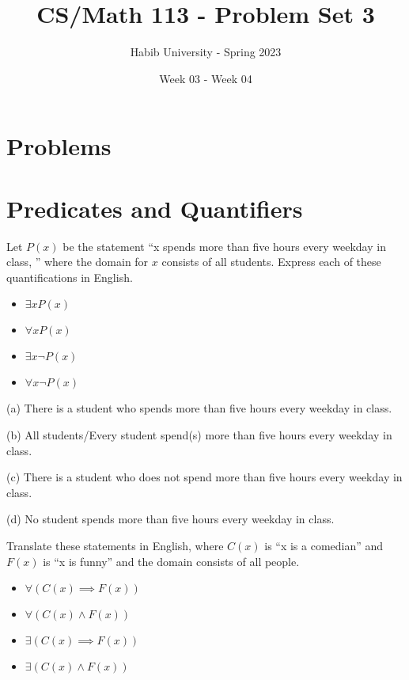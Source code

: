 \documentclass[addpoints]{exam}
\title{CS/Math 113 - Problem Set 3}
\author{Habib University - Spring 2023}
\date{Week 03 - Week 04}
\newenvironment{problem}[2][Problem]{\begin{trivlist}
    \item[\hskip \labelsep {\bfseries #1}\hskip \labelsep {\bfseries #2.}]}{\end{trivlist}}
\begin{document}
\maketitle
\begin{sloppypar}
\section*{Problems}

\section*{Predicates and Quantifiers}

\begin{problem}{1}
Let $P(x)$ be the statement ``x spends more than five hours every weekday in class, '' where the domain for $x$ consists of all students.
Express each of these quantifications in English.
\begin{itemize}
    \item[(a)] $\exists x P(x)$
    \item[(b)] $\forall x P(x)$
    \item[(c)] $\exists x \neg P(x)$
    \item[(d)] $\forall x \neg P(x)$
\end{itemize}
\end{problem}

\begin{questions}
    \question
    \begin{solution}
        
        (a) There is a student who spends more than five hours every weekday in class.

        (b) All students/Every student spend(s) more than five hours every weekday in class.

        (c) There is a student who does not spend more than five hours every weekday in class.

        (d) No student spends more than five hours every weekday in class.
    \end{solution}
\end{questions}
\pagebreak
\begin{problem}{2}
Translate these statements in English, where $C(x)$ is ``x is a comedian'' and $F(x)$ is ``x is funny'' and the domain consists of all people.
\begin{itemize}
    \item[(a)] $\forall(C(x) \implies F(x))$
    \item[(b)] $\forall(C(x) \land F(x))$
    \item[(c)] $\exists(C(x) \implies F(x))$
    \item[(d)] $\exists(C(x) \land F(x))$
\end{itemize}
\end{problem}


\end{sloppypar}
\end{document}

